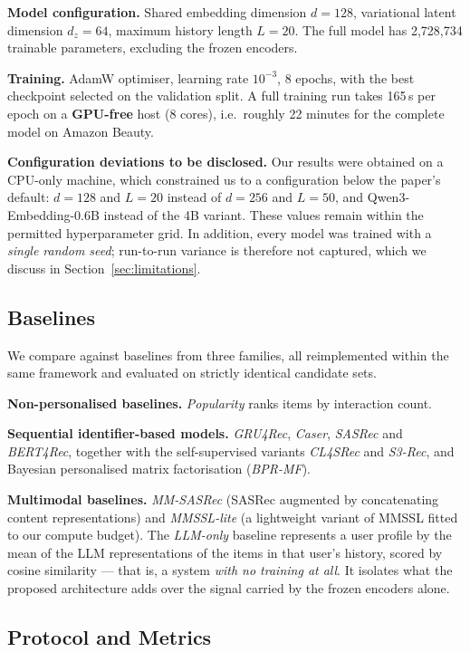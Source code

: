 \textbf{Model configuration.} Shared embedding dimension $d=128$, variational
latent dimension $d_z=64$, maximum history length $L=20$. The full model has
2{,}728{,}734 trainable parameters, excluding the frozen encoders.

\textbf{Training.} AdamW optimiser, learning rate $10^{-3}$, 8 epochs, with the
best checkpoint selected on the validation split. A full training run takes
165\,s per epoch on a \textbf{GPU-free} host (8 cores), i.e.\ roughly 22 minutes
for the complete model on Amazon Beauty.

\textbf{Configuration deviations to be disclosed.} Our results were obtained on
a CPU-only machine, which constrained us to a configuration below the paper's
default: $d=128$ and $L=20$ instead of $d=256$ and $L=50$, and
Qwen3-Embedding-0.6B instead of the 4B variant. These values remain within the
permitted hyperparameter grid. In addition, every model was trained with a
\emph{single random seed}; run-to-run variance is therefore not captured, which
we discuss in Section~\ref{sec:limitations}.

\subsection{Baselines}
\label{sec:baselines}

We compare \model{} against baselines from three families, all reimplemented
within the same framework and evaluated on strictly identical candidate sets.

\textbf{Non-personalised baselines.} \emph{Popularity} ranks items by
interaction count.

\textbf{Sequential identifier-based models.} \emph{GRU4Rec}, \emph{Caser},
\emph{SASRec} and \emph{BERT4Rec}, together with the self-supervised variants
\emph{CL4SRec} and \emph{S3-Rec}, and Bayesian personalised matrix
factorisation (\emph{BPR-MF}).

\textbf{Multimodal baselines.} \emph{MM-SASRec} (SASRec augmented by
concatenating content representations) and \emph{MMSSL-lite} (a lightweight
variant of MMSSL fitted to our compute budget). The \emph{LLM-only} baseline
represents a user profile by the mean of the LLM representations of the items
in that user's history, scored by cosine similarity --- that is, a system
\emph{with no training at all}. It isolates what the proposed architecture adds
over the signal carried by the frozen encoders alone.

\subsection{Protocol and Metrics}
\label{sec:protocol}

